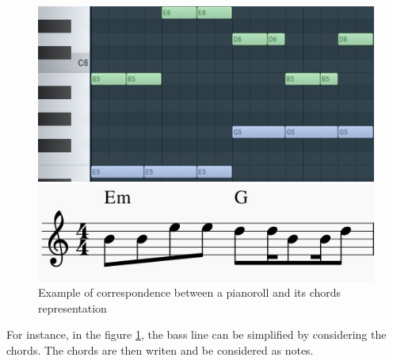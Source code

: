 \documentclass[12pt]{report}
\begin{document}
\begin{figure}[H]
   \begin{minipage}{0.5\textwidth}
     \centering
     \includegraphics[width=.9\linewidth]{images/music/pianoroll/pianoroll_small.jpg}
   \end{minipage}\hfill
   \begin{minipage}{0.5\textwidth}
     \centering
     \includegraphics[width=.9\linewidth]{images/music/stave/stave_with_chords.jpg}
   \end{minipage}
 \caption{Example of correspondence between a pianoroll and its chords representation}
 \label{fig:pianoroll_to_chords}
\end{figure}

For instance, in the figure \ref{fig:pianoroll_to_chords}, the bass line can be simplified by considering the chords.
The chords are then writen and be considered as notes.



\end{document}
